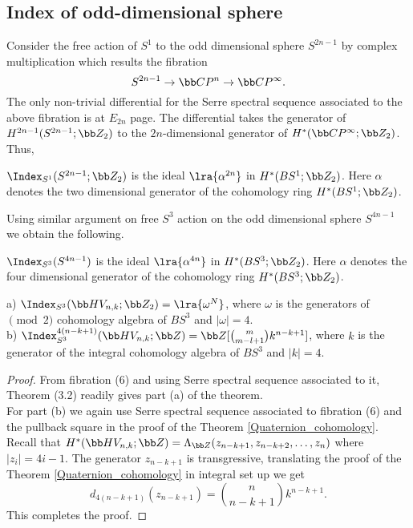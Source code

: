 \subsection{Index of odd-dimensional sphere}
Consider the free action of $S^1$ to the odd dimensional sphere $S^{2n-1}$ by complex multiplication which results the fibration \[S^{2n-1}\to \bb CP^n\to \bb CP^{\infty}. \] The only non-trivial differential for the Serre spectral sequence associated to the above fibration is at $E_{2n}$ page. The differential takes the generator of $H^{2n-1}(S^{2n-1};\bb Z_2)$ to the $2n$-dimensional generator of $H^{*}(\bb CP^{\infty};\bb Z_2)$. Thus, 
\begin{proposition}
$\Index_{S^1}(S^{2n-1};\bb Z_2)$ is the ideal $\lra{\alpha^{2n}}$ in  $H^*(BS^1;\bb Z_2)$. Here $\alpha$ denotes the two dimensional generator of the cohomology ring $H^*(BS^1;\bb Z_2)$.
\end{proposition}
Using similar argument on free $S^3$ action on the odd dimensional sphere $S^{4n-1}$ we obtain the following. 
\begin{proposition}\label{index}
$\Index_{S^3}(S^{4n-1})$ is the ideal $\lra{\alpha^{4n}}$ in  $H^*(BS^3; \bb Z_2)$. Here $\alpha$ denotes the four dimensional generator of the cohomology ring $H^*(BS^3; \bb Z_2)$.
\end{proposition}
\begin{theorem}\label{indst}
 a) $\Index_{S^3}(\bb HV_{n,k};\bb Z_2)=\lra{\omega^N}$,
 where $\omega$ is the generators of $\pmod 2$ cohomology algebra of $BS^3$ and $|\omega|=4$.\\
 b) $\Index_{S^3}^{4(n-k+1)}(\bb HV_{n,k};\bb Z)=\bb Z[\binom{m}{m-l+1}k^{n-k+1}]$, where $k$ is the generator of the integral cohomology algebra of $BS^3$ and $|k|=4$.
\end{theorem}
\begin{proof}
From fibration (6) and using Serre spectral sequence associated to it, Theorem (3.2) readily gives part (a) of the theorem.\\

For part (b) we again use Serre spectral sequence associated to fibration (6) and the pullback square in the proof of the Theorem \ref{Quaternion_cohomology}. Recall that $H^*(\bb HV_{n,k};\bb Z)=\Lambda_{\bb Z}(z_{n-k+1}, z_{n-k+2}, \ldots, z_{n})$ where  $|z_i|=4i-1$. The generator $z_{n-k+1}$ is transgressive, translating the proof of the Theorem \ref{Quaternion_cohomology} in integral set up we get \[d_{4(n-k+1)}(z_{n-k+1})=\binom{n}{n-k+1}k^{n-k+1}.\] This completes the proof.
\end{proof}
 
